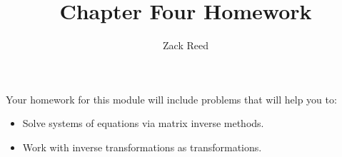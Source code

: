 \documentclass{ximera}
\author{Zack Reed}
\title{Chapter Four Homework}
\begin{document}
 
\begin{abstract}
\end{abstract}
 
\maketitle
 
Your homework for this module will include problems that will help you to:
 
\begin{itemize}
\item Solve systems of equations via matrix inverse methods.
\item Work with inverse transformations as transformations.
\end{itemize}
 
 
\end{document}
